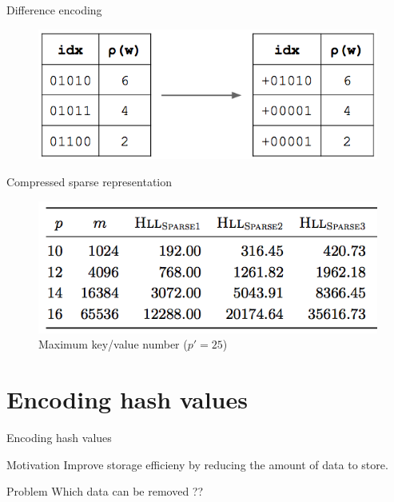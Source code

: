 \documentclass{beamer}
\begin{document}
\begin{frame}{Difference encoding}

  \begin{figure}[c]
    \includegraphics [scale=0.5]  {hyperloglog_difference.png}
  \end{figure}


\end{frame}

\begin{frame}{Compressed sparse representation}

  \begin{figure}[c]
    \includegraphics [scale=0.45]  {sparse123.png}
    \caption{Maximum key/value number ($p' = 25$)}
  \end{figure}

\end{frame}


\section{Encoding hash values}
\begin{frame}{Encoding hash values}

  \begin{block}{Motivation}
    Improve storage efficieny by reducing the amount of data to store.
  \end{block}

  \begin{block}{Problem}
    Which data can be removed ??
  \end{block}

\end{frame}
\end{document}
